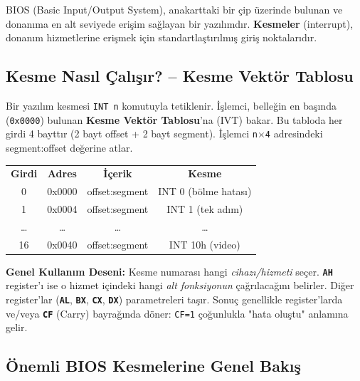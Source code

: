 \documentclass[11pt,a4paper]{article}
\newcommand{\reg}[1]{\texttt{\color{anaMavi}\textbf{#1}}}
\newcommand{\hx}[1]{\texttt{\color{turuncu}#1}}
\newcommand{\kod}[1]{\texttt{\color{koyuGri}#1}}
\begin{document}
BIOS (Basic Input/Output System), anakarttaki bir çip üzerinde bulunan ve
donanıma en alt seviyede erişim sağlayan bir yazılımdır. \textbf{Kesmeler}
(interrupt), donanım hizmetlerine erişmek için standartlaştırılmış giriş
noktalarıdır.

\subsection{Kesme Nasıl Çalışır? -- Kesme Vektör Tablosu}

Bir yazılım kesmesi \kod{INT n} komutuyla tetiklenir. İşlemci, belleğin en
başında (\hx{0x0000}) bulunan \textbf{Kesme Vektör Tablosu}'na (IVT) bakar.
Bu tabloda her girdi 4 bayttır (2 bayt offset + 2 bayt segment). İşlemci
\kod{n$\times$4} adresindeki segment:offset değerine atlar.

\begin{center}
\begin{tabular}{|c|c|c|c|}
\hline
\rowcolor{anaMavi}\multicolumn{4}{|c|}{\color{white}\textbf{Kesme Vektör Tablosu (IVT) -- adres 0x0000}}\\
\hline
\cellcolor{acikMavi}\textbf{Girdi} & \cellcolor{acikMavi}\textbf{Adres} & \cellcolor{acikMavi}\textbf{İçerik} & \cellcolor{acikMavi}\textbf{Kesme} \\
\hline
0 & 0x0000 & offset:segment & INT 0 (bölme hatası) \\
\hline
1 & 0x0004 & offset:segment & INT 1 (tek adım) \\
\hline
\dots & \dots & \dots & \dots \\
\hline
16 & 0x0040 & offset:segment & INT 10h (video) \\
\hline
\end{tabular}
\end{center}

\begin{bilgikutu}
\textbf{Genel Kullanım Deseni:} Kesme numarası hangi \emph{cihazı/hizmeti}
seçer. \reg{AH} register'ı ise o hizmet içindeki hangi \emph{alt fonksiyonun}
çağrılacağını belirler. Diğer register'lar (\reg{AL}, \reg{BX}, \reg{CX},
\reg{DX}) parametreleri taşır. Sonuç genellikle register'larda ve/veya
\reg{CF} (Carry) bayrağında döner: \kod{CF=1} çoğunlukla "hata oluştu"
anlamına gelir.
\end{bilgikutu}

\subsection{Önemli BIOS Kesmelerine Genel Bakış}
\end{document}
